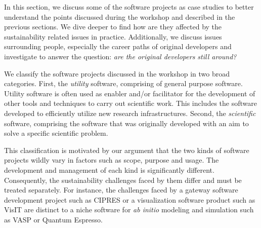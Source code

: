 \documentclass[11pt, oneside]{amsart}
\newcommand{\toolname}[1] {\textsf{#1}}
\begin{document}




In this section, we discuss some of the software projects as case studies to
better understand the points discussed during the workshop and described in the
previous sections. We dive deeper to find how are they affected by the
sustainability related issues in practice. Additionally, we discuss issues
surrounding people, especially the career paths of original developers and
investigate to answer the question: \emph{are the original developers still
around?}

We classify the software projects discussed in the workshop in two broad
categories. First, the \emph{utility} software, comprising of general purpose
software. Utility software is often used as enabler and/or facilitator for the
development of other tools and techniques to carry out scientific work. This
includes the software developed to efficiently utilize new research
infrastructures. Second, the \emph{scientific} software, comprising the
software that was originally developed with an aim to solve a specific
scientific problem.

This classification is motivated by our argument that the two kinds of software
projects wildly vary in factors such as scope, purpose and usage. The
development and management of each kind is significantly different.
Consequently, the sustainability challenges faced by them differ and must be
treated separately. For instance, the challenges faced by a gateway software
development project such as \toolname{CIPRES} or a visualization software product
such as \toolname{VisIT} are distinct to a niche software for \textit{ab initio}
modeling and simulation such as \toolname{VASP} or \toolname{Quantum Espresso}.
\end{document}
